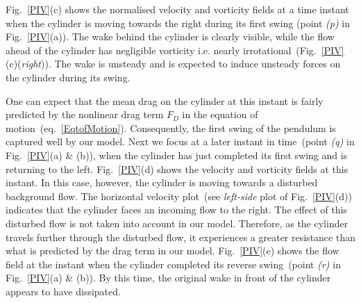 \documentclass{jfm}
\begin{document}
{%
Fig.~\ref{PIV}(c) shows the normalised velocity and vorticity fields at a time instant when the cylinder is moving towards the right during its first swing (point {\it(p)} in Fig.~\ref{PIV}(a)). The wake behind the cylinder is clearly visible, while the flow ahead of  the cylinder has negligible vorticity i.e. nearly irrotational~(Fig.~\ref{PIV}(c)(\textit{right})). The wake is unsteady and is expected to induce unsteady forces on the cylinder during its swing.



One can expect that the mean drag on the cylinder at this instant is fairly predicted  by the nonlinear drag term $F_D$ in the equation of motion~(eq.~\ref{EqtofMotion}). Consequently, the first swing of the pendulum is captured well by our model.
Next we focus at a later instant in time~(point {\it (q)} in Fig.~\ref{PIV}(a) \& (b)), when the cylinder has just completed its first swing and is returning to the left. Fig.~\ref{PIV}(d) shows the velocity and vorticity fields at this instant. In this case, however, the cylinder is moving towards a disturbed background flow. The horizontal velocity plot~(see \textit{left-side} plot of Fig.~\ref{PIV}(d)) indicates that the cylinder faces an incoming flow to the right. The effect of this disturbed flow is not taken into account in our model. Therefore, as the cylinder travels further through the disturbed flow, it experiences a greater resistance than what is predicted by the drag term in our model. Fig.~\ref{PIV}(e) shows the flow field at the instant when the cylinder completed its reverse swing~(point {\it (r)} in Fig.~\ref{PIV}(a) \& (b)). By this time, the original wake in front of the cylinder appears to have dissipated. 

}
\end{document}
